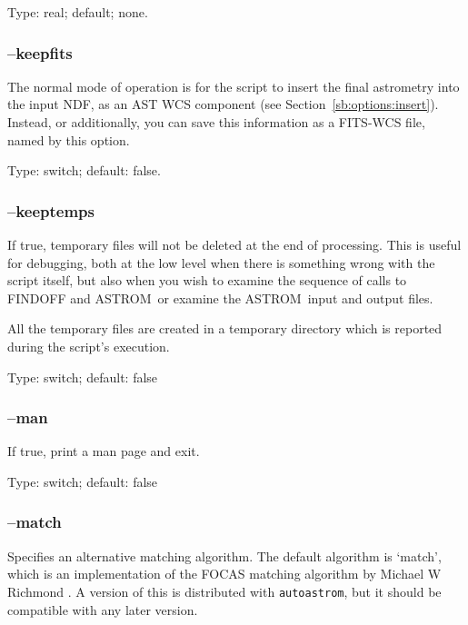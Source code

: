 \documentclass[twoside,11pt]{article}
\newcommand{\xlabel}[1]{}
\newcommand{\ASTROM}{{\footnotesize ASTROM}\normalsize}
\newcommand{\autoastrom}{\texttt{autoastrom}}
\begin{document}
Type: real; default; none.

\subsubsection{\xlabel{sb_options_keepfits}--keepfits\label{sb:options:keepfits}}

The normal mode of operation is for the script to insert the final astrometry
into the input NDF, as an AST WCS component (see
Section~\ref{sb:options:insert}).  Instead, or additionally, you can save this
information as a FITS-WCS file, named by this option.

Type: switch; default: false.

\subsubsection{\xlabel{sb_options_keeptemps}--keeptemps\label{sb:options:keeptemps}}

If true, temporary files will not be deleted at the end of processing.  This
is useful for debugging, both at the low level when there is something wrong
with the script itself, but also when you wish to examine the sequence of
calls to FINDOFF and \ASTROM\, or examine the \ASTROM\ input and output
files.

All the temporary files are created in a temporary directory which is
reported during the script's execution.

Type: switch; default: false

\subsubsection{\xlabel{sb_options_man}--man\label{sb:options:man}}

If true, print a man page and exit.

Type: switch; default: false

\subsubsection{\xlabel{sb_options_match}--match\label{sb:options:match}}

Specifies an alternative matching algorithm.  The default algorithm is
`match', which is an implementation of the FOCAS matching algorithm
\cite{valdes95} by Michael W Richmond \cite{match-home}.  A version of this is
distributed with \autoastrom, but it should be compatible with any later
version.
\end{document}
